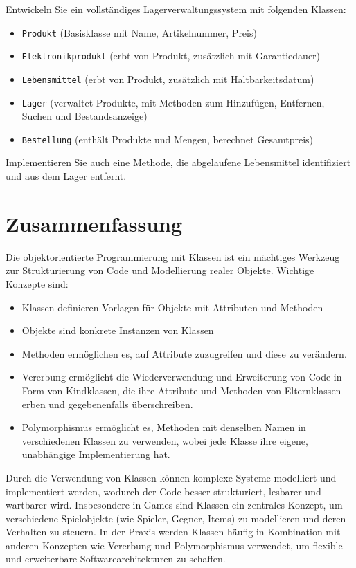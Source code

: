 \begin{mychallenge}
	Entwickeln Sie ein vollständiges Lagerverwaltungssystem mit folgenden Klassen:
	\begin{itemize}
		\item \lstinline|Produkt| (Basisklasse mit Name, Artikelnummer, Preis)
		\item \lstinline|Elektronikprodukt| (erbt von Produkt, zusätzlich mit Garantiedauer)
		\item \lstinline|Lebensmittel| (erbt von Produkt, zusätzlich mit Haltbarkeitsdatum)
		\item \lstinline|Lager| (verwaltet Produkte, mit Methoden zum Hinzufügen, Entfernen, Suchen und Bestandsanzeige)
		\item \lstinline|Bestellung| (enthält Produkte und Mengen, berechnet Gesamtpreis)
	\end{itemize}

	Implementieren Sie auch eine Methode, die abgelaufene Lebensmittel identifiziert und aus dem Lager entfernt.
\end{mychallenge}



\section{Zusammenfassung}
Die objektorientierte Programmierung mit Klassen ist ein mächtiges Werkzeug zur Strukturierung von Code und Modellierung realer Objekte. Wichtige Konzepte sind:

\begin{itemize}
	\item Klassen definieren Vorlagen für Objekte mit Attributen und Methoden
	\item Objekte sind konkrete Instanzen von Klassen
	\item Methoden ermöglichen es, auf Attribute zuzugreifen und diese zu verändern.
	\item Vererbung ermöglicht die Wiederverwendung und Erweiterung von Code in Form von Kindklassen, die ihre Attribute und Methoden von Elternklassen erben und gegebenenfalls überschreiben.
	\item Polymorphismus ermöglicht es, Methoden mit denselben Namen in verschiedenen Klassen zu verwenden, wobei jede Klasse ihre eigene, unabhängige Implementierung hat.
\end{itemize}

Durch die Verwendung von Klassen können komplexe Systeme modelliert und implementiert werden, wodurch der Code besser strukturiert, lesbarer und wartbarer wird. Insbesondere in Games sind Klassen ein zentrales Konzept, um verschiedene Spielobjekte (wie Spieler, Gegner, Items) zu modellieren und deren Verhalten zu steuern. In der Praxis werden Klassen häufig in Kombination mit anderen Konzepten wie Vererbung und Polymorphismus verwendet, um flexible und erweiterbare Softwarearchitekturen zu schaffen.
